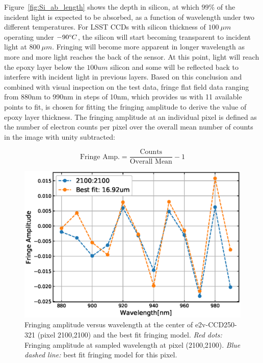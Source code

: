 \documentclass[twocolumn]{aastex63} %
\begin{document}
\begin{CJK*}{UTF8}{gbsn}
Figure~\ref{fig:Si_ab_length} shows the depth in silicon, at which $99\%$ of the incident light is expected to be absorbed, as a function of wavelength under two different temperatures. For LSST CCDs with silicon thickness of $100\ \mu m$ operating under $-90 \degree C$, the silicon will start becoming transparent to incident light at $800\ \mu m$. Fringing will become more apparent in longer wavelength as more and more light reaches the back of the sensor. At this point, light will reach the epoxy layer below the $100um$ silicon and some will be reflected back to interfere with incident light in previous layers. Based on this conclusion and combined with visual inspection on the test data, fringe flat field data ranging from 880nm to 990nm in steps of 10nm, which provides us with 11 available points to fit, is chosen for fitting the fringing amplitude to derive the value of epoxy layer thickness. The fringing amplitude at an individual pixel is defined as the number of electron counts per pixel over the overall mean number of counts in the image with unity subtracted:

\begin{equation}
    \mbox{Fringe\ Amp.} = \frac{\mbox{Counts}}{\mbox{Overall\ Mean}}- 1
\end{equation}
\begin{figure}[tb]
\centering
\includegraphics[scale = 0.45]{fit_example.eps}
\caption{Fringing amplitude versus wavelength at the center of e2v-CCD250-321 (pixel 2100,2100) and the best fit fringing model. {\it Red dots:} Fringing amplitude at sampled wavelength at pixel (2100,2100). {\it Blue dashed line:} best fit fringing model for this pixel.} 
\label{fig:Fitting_exmaple}
\end{figure}


\end{CJK*}
\end{document}
